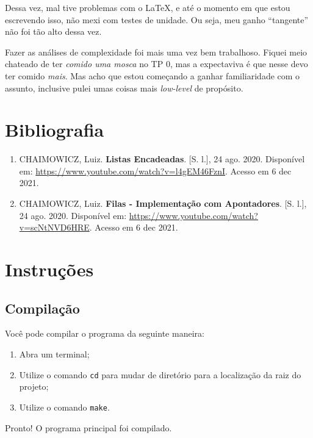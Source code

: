 \documentclass{article}
\def\code#1{\texttt{#1}}
\begin{document}
Dessa vez, mal tive problemas com o \LaTeX, e até o momento em que estou escrevendo isso, não mexi com testes de unidade. Ou seja, meu ganho ``tangente'' não foi tão alto dessa vez.

Fazer as análises de complexidade foi mais uma vez bem trabalhoso. Fiquei meio chateado de ter \textit{comido uma mosca} no TP 0, mas a expectaviva é que nesse devo ter comido \textit{mais}. Mas acho que estou começando a ganhar familiaridade com o assunto, inclusive pulei umas coisas mais \textit{low-level} de propósito.


\section{Bibliografia}

\begin{enumerate}

    \item CHAIMOWICZ, Luiz. \textbf{Listas Encadeadas}. [S. l.], 24 ago. 2020. Disponível em: \url{https://www.youtube.com/watch?v=l4gEM46FznI}. Acesso em 6 dec 2021.

    \item CHAIMOWICZ, Luiz. \textbf{Filas - Implementação com Apontadores}. [S. l.], 24 ago. 2020. Disponível em: \url{https://www.youtube.com/watch?v=scNtNVD6HRE}. Acesso em 6 dec 2021.

\end{enumerate}


\newpage
\section*{Instruções}

\subsection*{Compilação}

Você pode compilar o programa da seguinte maneira:

\begin{enumerate}
    \item Abra um terminal;
    \item Utilize o comando \code{cd} para mudar de diretório para a localização da raiz do projeto;
    \item Utilize o comando \code{make}. 
\end{enumerate}

Pronto! O programa principal foi compilado. 
\end{document}
